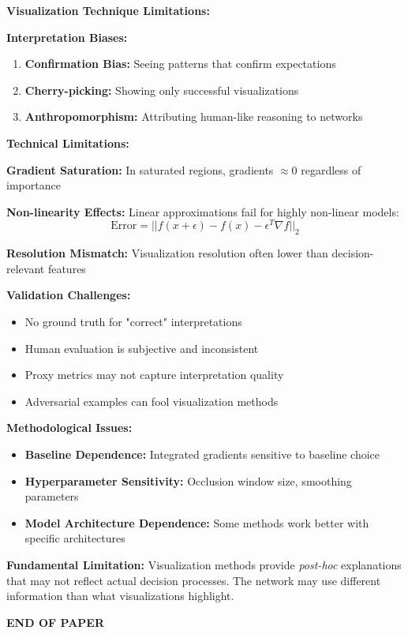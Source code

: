 \documentclass[12pt]{article}
\begin{document}
\begin{enumerate}[(a)]
{    \textbf{Visualization Technique Limitations:}
    
    \textbf{Interpretation Biases:}
    \begin{enumerate}
        \item \textbf{Confirmation Bias:} Seeing patterns that confirm expectations
        \item \textbf{Cherry-picking:} Showing only successful visualizations
        \item \textbf{Anthropomorphism:} Attributing human-like reasoning to networks
    \end{enumerate}
    
    \textbf{Technical Limitations:}
    
    \textbf{Gradient Saturation:} In saturated regions, gradients $\approx 0$ regardless of importance
    
    \textbf{Non-linearity Effects:} Linear approximations fail for highly non-linear models:
    $$\text{Error} = ||f(x+\epsilon) - f(x) - \epsilon^T \nabla f||_2$$
    
    \textbf{Resolution Mismatch:} Visualization resolution often lower than decision-relevant features
    
    \textbf{Validation Challenges:} 
    \begin{itemize}
        \item No ground truth for "correct" interpretations
        \item Human evaluation is subjective and inconsistent
        \item Proxy metrics may not capture interpretation quality
        \item Adversarial examples can fool visualization methods
    \end{itemize}
    
    \textbf{Methodological Issues:}
    \begin{itemize}
        \item \textbf{Baseline Dependence:} Integrated gradients sensitive to baseline choice
        \item \textbf{Hyperparameter Sensitivity:} Occlusion window size, smoothing parameters
        \item \textbf{Model Architecture Dependence:} Some methods work better with specific architectures
    \end{itemize}
    
    \textbf{Fundamental Limitation:}
    Visualization methods provide \textit{post-hoc} explanations that may not reflect actual decision processes. The network may use different information than what visualizations highlight.
    }
\end{enumerate}

\vfill
\begin{center}{\bf END OF PAPER}\end{center}
\end{document}
